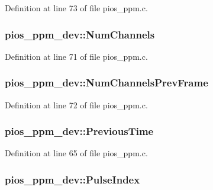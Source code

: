 Definition at line 73 of file pios\-\_\-ppm.\-c.

\hypertarget{structpios__ppm__dev_ad22d6ba25b163e89459fa089bb3a3d45}{
\subsubsection[{Num\-Channels}]{ pios\-\_\-ppm\-\_\-dev\-::\-Num\-Channels}}\label{structpios__ppm__dev_ad22d6ba25b163e89459fa089bb3a3d45}


Definition at line 71 of file pios\-\_\-ppm.\-c.

\hypertarget{structpios__ppm__dev_ac648f6b4bdf6793c422676689daaca77}{
\subsubsection[{Num\-Channels\-Prev\-Frame}]{ pios\-\_\-ppm\-\_\-dev\-::\-Num\-Channels\-Prev\-Frame}}\label{structpios__ppm__dev_ac648f6b4bdf6793c422676689daaca77}


Definition at line 72 of file pios\-\_\-ppm.\-c.

\hypertarget{structpios__ppm__dev_acdc4c4f35b3ab795bcf29ecc9a3f4b45}{
\subsubsection[{Previous\-Time}]{ pios\-\_\-ppm\-\_\-dev\-::\-Previous\-Time}}\label{structpios__ppm__dev_acdc4c4f35b3ab795bcf29ecc9a3f4b45}


Definition at line 65 of file pios\-\_\-ppm.\-c.

\hypertarget{structpios__ppm__dev_a86d68429cfa42b6688d6bc4c307de08e}{
\subsubsection[{Pulse\-Index}]{ pios\-\_\-ppm\-\_\-dev\-::\-Pulse\-Index}}\label{structpios__ppm__dev_a86d68429cfa42b6688d6bc4c307de08e}


